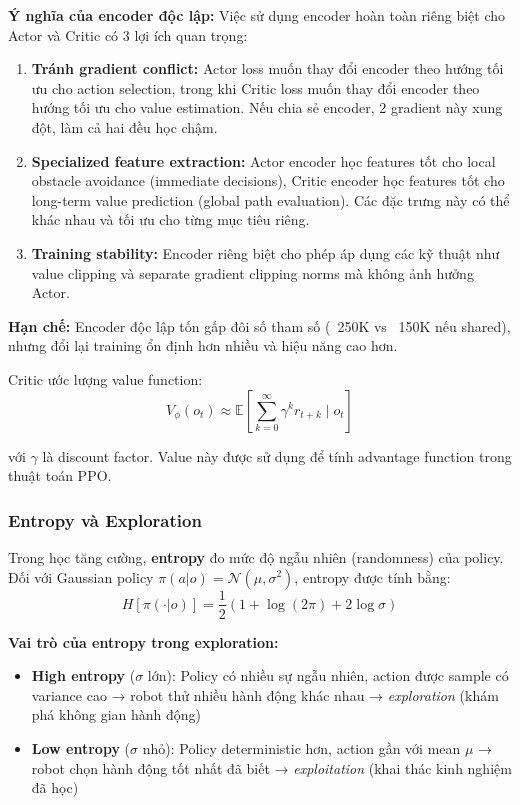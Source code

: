 \textbf{Ý nghĩa của encoder độc lập:} Việc sử dụng encoder hoàn toàn riêng biệt cho Actor và Critic có 3 lợi ích quan trọng:

\begin{enumerate}[nosep]
\item \textbf{Tránh gradient conflict:} Actor loss muốn thay đổi encoder theo hướng tối ưu cho action selection, trong khi Critic loss muốn thay đổi encoder theo hướng tối ưu cho value estimation. Nếu chia sẻ encoder, 2 gradient này xung đột, làm cả hai đều học chậm.

\item \textbf{Specialized feature extraction:} Actor encoder học features tốt cho local obstacle avoidance (immediate decisions), Critic encoder học features tốt cho long-term value prediction (global path evaluation). Các đặc trưng này có thể khác nhau và tối ưu cho từng mục tiêu riêng.

\item \textbf{Training stability:} Encoder riêng biệt cho phép áp dụng các kỹ thuật như value clipping và separate gradient clipping norms mà không ảnh hưởng Actor.
\end{enumerate}

\textbf{Hạn chế:} Encoder độc lập tốn gấp đôi số tham số (~250K vs ~150K nếu shared), nhưng đổi lại training ổn định hơn nhiều và hiệu năng cao hơn.

Critic ước lượng value function:
\begin{equation}
V_\phi(o_t) \approx \mathbb{E}\left[\sum_{k=0}^{\infty} \gamma^k r_{t+k} \mid o_t\right]
\end{equation}

với $\gamma$ là discount factor. Value này được sử dụng để tính advantage function trong thuật toán PPO.

\subsubsection{Entropy và Exploration}

Trong học tăng cường, \textbf{entropy} đo mức độ ngẫu nhiên (randomness) của policy. Đối với Gaussian policy $\pi(a|o) = \mathcal{N}(\mu, \sigma^2)$, entropy được tính bằng:
\begin{equation}
H[\pi(\cdot|o)] = \frac{1}{2}(1 + \log(2\pi) + 2\log\sigma)
\end{equation}

\textbf{Vai trò của entropy trong exploration:}

\begin{itemize}[nosep]
\item \textbf{High entropy} ($\sigma$ lớn): Policy có nhiều sự ngẫu nhiên, action được sample có variance cao → robot thử nhiều hành động khác nhau → \textit{exploration} (khám phá không gian hành động)

\item \textbf{Low entropy} ($\sigma$ nhỏ): Policy deterministic hơn, action gần với mean $\mu$ → robot chọn hành động tốt nhất đã biết → \textit{exploitation} (khai thác kinh nghiệm đã học)
\end{itemize}

